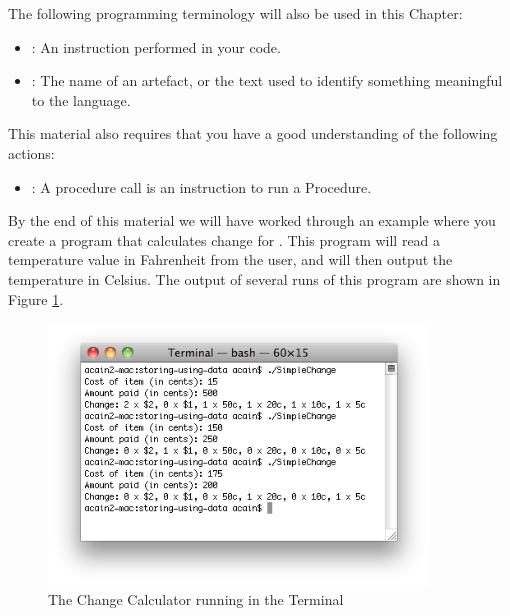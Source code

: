 The following programming terminology will also be used in this Chapter:
\begin{itemize}
  \item {}: An instruction performed in your code.
  \item {}: The name of an artefact, or the text used to identify something meaningful to the language.
\end{itemize}

This material also requires that you have a good understanding of the following actions:
\begin{itemize}
  \item {}: A procedure call is an instruction to run a Procedure.
\end{itemize}

\clearpage

By the end of this material we will have worked through an example where you create a program that calculates change for . This program will read a temperature value in Fahrenheit from the user, and will then output the temperature in Celsius. The output of several runs of this program are shown in Figure \ref{fig:storing-using-simeple-change}.

\begin{figure}[h]
   \centering
   \includegraphics[width=0.9\textwidth]{./topics/storing-using-data/images/SimpleChange} 
   \caption{The Change Calculator running in the Terminal}
   \label{fig:storing-using-simeple-change}
\end{figure}















